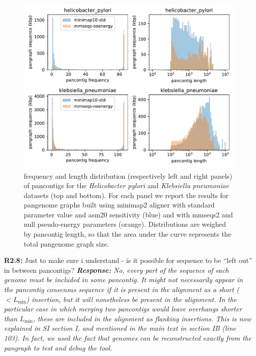 \documentclass[aps,rmp,onecolumn]{revtex4-1}
\newcommand{\Lthr}{L_{\min}}
\newcommand{\Marco}[1]{{\color{gray}Marco: #1}}
\newcommand{\Liam}[1]{{\color{teal}Liam: #1}}
\newcommand{\reviewer}[2]{\textbf{#1:} #2\vskip 5mm}
\newcommand{\response}[1]{{\it {\color{response}\textbf{Response:} #1}}\vskip 5mm}
\begin{document}
\begin{figure}[htb]
      \includegraphics[width=.7\textwidth]{figs_response/hp_vs_kp.pdf}
      \caption{frequency and length distribution (respectively left and right panels) of pancontigs for the \textit{Helicobacter pylori} and \textit{Klebsiella pneumoniae} datasets (top and bottom). For each panel we report the results for pangenome graphs built using minimap2 aligner with standard parameter value and asm20 sensitivity (blue) and with mmseqs2 and null pseudo-energy parameters (orange). Distributions are weighed by pancontig length, so that the area under the curve represents the total pangenome graph size.}
      \label{fig:kp-vs-hp}
\end{figure}

\reviewer{R2.8}{Just to make sure i understand - is it possible for sequence to be ``left out'' in between pancontigs?}
\response{No, every part of the sequence of each genome must be included in some pancontig. It might not necessarily appear in the pancontig consensus sequence if it is present in the alignment as a short ($< \Lthr$) insertion, but it will nonetheless be present in the alignment. In the particular case in which merging two pancontigs would leave overhangs shorter than $\Lthr$, these are included in the alignment as flanking insertions. This is now explained in SI section I, and mentioned in the main text in section IB (line 103).
      In fact, we used the fact that genomes can be reconstructed exactly from the pangraph to test and debug the tool. }
\end{document}
